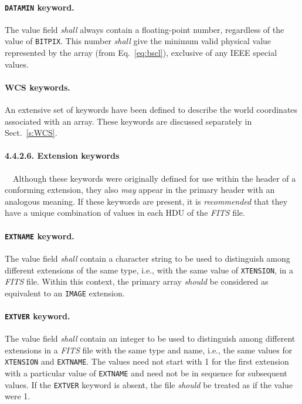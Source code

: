 \documentclass[onecolumn]{aa}
\begin{document}
   \paragraph{{\tt DATAMIN} keyword.}
 The value field {\em shall} always contain a floating-point
 number, regardless of the value of {\tt BITPIX}. This
 number {\em shall} give the minimum valid physical value 
 represented by the array  (from Eq.~\ref{eq:bscl}), exclusive of any
 IEEE special values.
  
\paragraph{WCS keywords.}
An extensive set of keywords have been defined to describe the world coordinates
associated with an array.  These keywords are discussed separately in 
Sect.\ \ref{s:WCS}.

\paragraph{4.4.2.6. Extension keywords}

\ \newline \ \newline Although these keywords were originally defined for use within
 the header of a conforming extension, they also {\em may} appear in the primary header 
 with an analogous meaning.
 If these keywords are present, it is {\em recommended} that they have
 a unique combination of values in each HDU of the {\em FITS\/} file.

  
   \paragraph{{\tt EXTNAME} keyword.}
 The value field {\em shall} contain a character 
 string to be
 used to distinguish
 among different extensions of the same 
 type, i.e., with the same value of {\tt XTENSION}, 
 in a {\em FITS\/} file.  Within this context, the primary array {\em should}
 be considered as equivalent to an {\tt IMAGE} extension.
  
   \paragraph{{\tt EXTVER} keyword.}
 The value field {\em shall} contain an integer to be used to
 distinguish among different extensions in a {\em FITS\/} file
 with the same type and name, i.e., the same values for 
 {\tt XTENSION} and {\tt EXTNAME}. The
 values need not start with 1 for the first extension with
 a particular value of {\tt EXTNAME} and need not be in
 sequence for subsequent values. If the {\tt EXTVER} keyword
 is absent, the file {\em should} be treated as if the value
 were 1.
  
\end{document}
